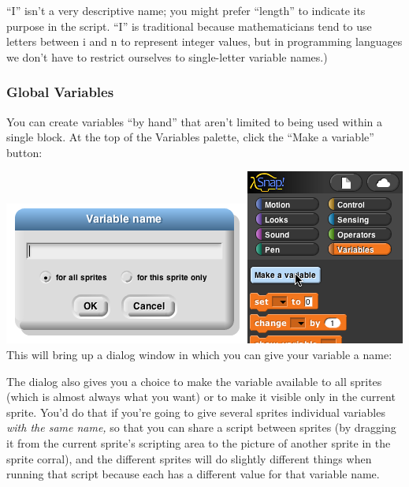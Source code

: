 ``I'' isn't a very descriptive name; you might prefer ``length'' to
indicate its purpose in the script. ``I'' is traditional because
mathematicians tend to use letters between i and n to represent integer
values, but in programming languages we don't have to restrict ourselves
to single-letter variable names.)

\subsubsection{\texorpdfstring{\hfill\break
Global Variables}{ Global Variables}}\label{global-variables}

You can create variables ``by hand'' that aren't limited to being used
within a single block. At the top of the Variables palette, click the
``Make a variable'' button:

\includegraphics[width=3.1875in,height=1.84375in]{media/image96.png}\includegraphics[width=2.05208in,height=2.27083in]{media/image97.png}This
will bring up a dialog window in which you can give your variable a
name:

The dialog also gives you a choice to make the variable available to all
sprites (which is almost always what you want) or to make it visible
only in the current sprite. You'd do that if you're going to give
several sprites individual variables \emph{with the same name,} so that
you can share a script between sprites (by dragging it from the current
sprite's scripting area to the picture of another sprite in the sprite
corral), and the different sprites will do slightly different things
when running that script because each has a different value for that
variable name.

